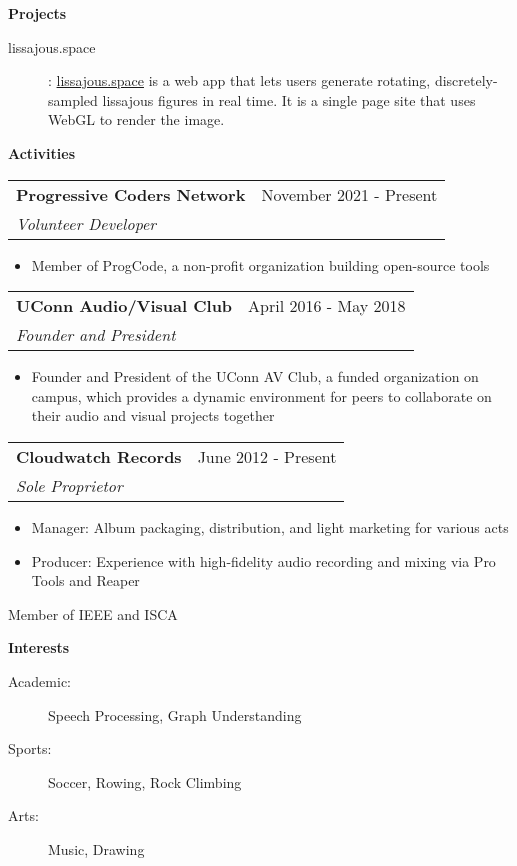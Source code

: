 \documentclass[letterpaper,11pt]{article}
\makeatletter
\newcommand{\resitem}[1]{\item #1 \vspace{-2pt}}
\newcommand{\resheading}[1]{{\large \colorbox{mygrey}{\begin{minipage}{\textwidth}{\textbf{#1 \vphantom{p\^{E}}}}\end{minipage}}}}
\newcommand{\ressubheading}[4]{
\begin{tabular*}{6.9in}{l@{\extracolsep{\fill}}r}
		\textbf{#1} & #2 \\
		\textit{#3} & \textit{#4} \\
\end{tabular*}\vspace{-6pt}}
\makeatother
\begin{document}
\resheading{Projects}
\begin{description}
    \item[lissajous.space]: \href{https://lissajous.space}{lissajous.space} is a web app that lets users generate rotating, discretely-sampled lissajous figures in real time. It is a single page site that uses WebGL to render the image.
\end{description}


\resheading{Activities}
\begin{description}
\item
    \ressubheading{Progressive Coders Network}{November 2021 - Present}{Volunteer Developer}{}
    \begin{itemize}
        \resitem{Member of ProgCode, a non-profit organization building open-source tools}
    \end{itemize}
\item
    \ressubheading{UConn Audio/Visual Club}{April 2016 - May 2018}{Founder and President}{}
    \begin{itemize}
        \resitem{Founder and President of the UConn AV Club, a funded organization on campus, which provides a dynamic environment for peers to collaborate on their audio and visual projects together}
    \end{itemize}
\item
    \ressubheading{Cloudwatch Records}{June 2012 - Present}{Sole Proprietor}{}
    \begin{itemize}
        \resitem{Manager: Album packaging, distribution, and light marketing for various acts}
        \resitem{Producer: Experience with high-fidelity audio recording and mixing via Pro Tools and Reaper}
    \end{itemize}
\item
    Member of IEEE and ISCA
\end{description}


\resheading{Interests}

\begin{description}
\item[Academic:] Speech Processing, Graph Understanding
\item[Sports:] Soccer, Rowing, Rock Climbing
\item[Arts:] Music, Drawing
\end{description}
\end{document}
